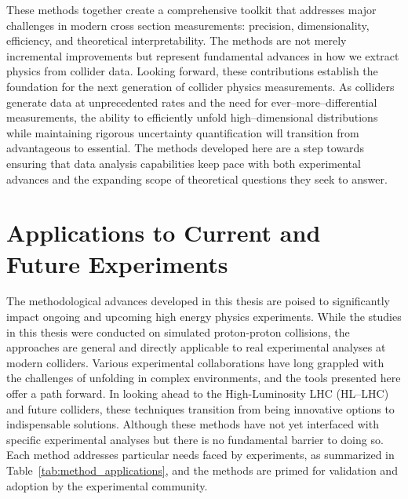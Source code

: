         These methods together create a comprehensive toolkit that addresses major challenges in modern cross section measurements: precision, dimensionality, efficiency, and theoretical interpretability.
        The methods are not merely incremental improvements but represent fundamental advances in how we extract physics from collider data.
        Looking forward, these contributions establish the foundation for the next generation of collider physics measurements.
        As colliders generate data at unprecedented rates and the need for ever--more--differential measurements, the ability to efficiently unfold high--dimensional distributions while maintaining rigorous uncertainty quantification will transition from advantageous to essential.
        The methods developed here are a step towards ensuring that data analysis capabilities keep pace with both experimental advances and the expanding scope of theoretical questions they seek to answer.

\section{Applications to Current and Future Experiments}
    The methodological advances developed in this thesis are poised to significantly impact ongoing and upcoming high energy physics experiments.
    While the studies in this thesis were conducted on simulated proton-proton collisions, the approaches are general and directly applicable to real experimental analyses at modern colliders.
    Various experimental collaborations have long grappled with the challenges of unfolding in complex environments, and the tools presented here offer a path forward.
    In looking ahead to the High-Luminosity LHC (HL--LHC) and future colliders, these techniques transition from being innovative options to indispensable solutions.
    Although these methods have not yet interfaced with specific experimental analyses but there is no fundamental barrier to doing so.
    Each method addresses particular needs faced by experiments, as summarized in Table~\ref{tab:method_applications}, and the methods are primed for validation and adoption by the experimental community.
    
